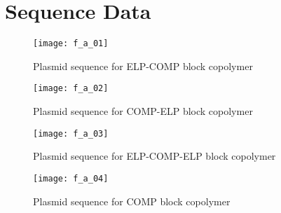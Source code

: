 \chapter{Sequence Data}
\label{chap:seq_data}

\lstset{basicstyle=\footnotesize,breakatwhitespace=true,breaklines=true,title=\lstname}

\begin{figure}[h!] \centering \texttt{[image: f\_a\_01]}
    \caption{Plasmid sequence for ELP-COMP block copolymer}\label{fig:plasmid_pQE30-EC} \end{figure}
\texttt{}

\begin{figure}[h!] \centering \texttt{[image: f\_a\_02]}
    \caption{Plasmid sequence for COMP-ELP block copolymer}\label{fig:plasmid_pQE30-CE} \end{figure}
\texttt{}

\begin{figure}[h!] \centering \texttt{[image: f\_a\_03]}
    \caption{Plasmid sequence for ELP-COMP-ELP block copolymer}\label{fig:plasmid_pQE30-ECE} \end{figure}
\texttt{}

\begin{figure}[h!] \centering \texttt{[image: f\_a\_04]}
    \caption{Plasmid sequence for COMP block copolymer}\label{fig:plasmid_pQE9-COMP} \end{figure}
\texttt{}
